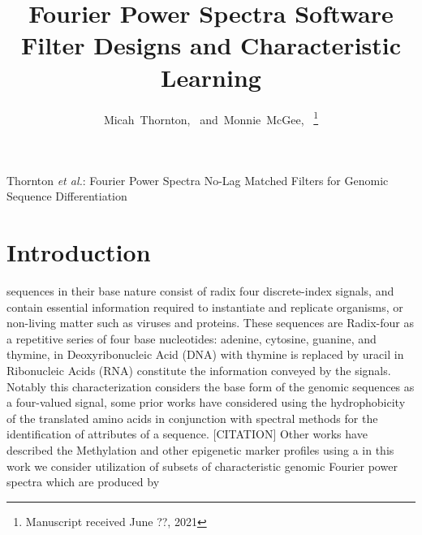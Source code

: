 \documentclass[12pt,journal,compsoc]{IEEEtran}
\begin{document}
\title{Fourier Power Spectra Software Filter Designs and Characteristic Learning}
\author{Micah~Thornton,~
        and~Monnie~McGee,~%
% 
\thanks{Manuscript received June ??, 2021}}%

%
{Thornton \MakeLowercase{\textit{et al.}}: Fourier Power Spectra No-Lag Matched Filters for Genomic Sequence Differentiation}

\maketitle

\IEEEdisplaynontitleabstractindextext

\IEEEpeerreviewmaketitle

\section{Introduction}
\label{sec:int}

 sequences in their base nature consist of radix four discrete-index signals, 
and contain essential information required to instantiate and replicate organisms, or non-living matter 
such as viruses and proteins.
These sequences are Radix-four as a repetitive series of four base nucleotides: adenine, cytosine, guanine, 
and thymine, in Deoxyribonucleic Acid (DNA) with thymine is replaced by uracil in Ribonucleic Acids 
(RNA) constitute the information conveyed by the signals. 
Notably this characterization considers the base form of the genomic sequences as a four-valued signal, 
some prior works have considered using the hydrophobicity of the translated amino acids in conjunction 
with spectral methods for the identification of attributes of a sequence. [CITATION] 
Other works have described the Methylation and other epigenetic marker profiles using a 
in this work we consider utilization of subsets of characteristic genomic Fourier power spectra which are
produced by 
\end{document}
